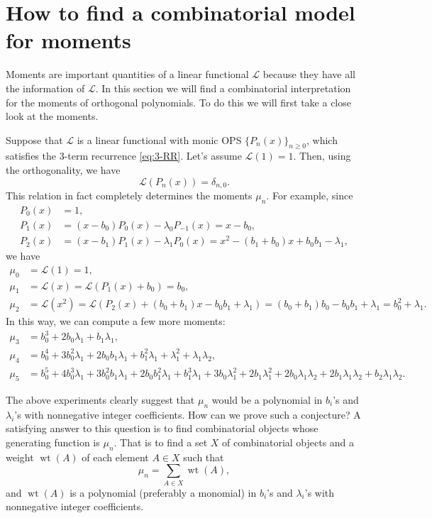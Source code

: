 \documentclass[oneside]{book}
\numberwithin{equation}{section}
\theoremstyle{definition}
\newcommand\LL{\mathcal{L}}
\newcommand\wt{\operatorname{wt}}
\begin{document}
\section{How to find a combinatorial model for moments}

Moments are important quantities of a linear functional \( \LL \)
because they have all the information of \( \LL \). In this section
we will find a combinatorial interpretation for the moments of
orthogonal polynomials. To do this we will first take a close look at
the moments.

Suppose that \( \LL \) is a linear functional with monic OPS
\( \{ P_n(x) \}_{n\ge 0} \), which satisfies the 3-term recurrence
\eqref{eq:3-RR}. Let's assume \( \LL(1)=1 \). Then, using the
orthogonality, we have
\begin{equation}\label{eq:13}
  \LL(P_n(x)) = \delta_{n,0}.
\end{equation}
This relation in fact completely determines the moments \( \mu_n \).
For example, since
\begin{align*}
  P_0(x) &= 1,\\
  P_1(x) &= (x-b_0)P_0(x) - \lambda_0P_{-1}(x) = x-b_0,\\
  P_2(x) &= (x-b_1)P_1(x) - \lambda_1P_0(x) =  x^2 - (b_1+b_0)x +b_0b_1 - \lambda_1,
\end{align*}
we have
\begin{align*}
 \mu_0 &= \LL(1) = 1, \\
 \mu_1 &= \LL(x) = \LL(P_1(x)+b_0) = b_0, \\
  \mu_2 &= \LL(x^2) = \LL(P_2(x)+(b_0+b_1)x-b_0b_1+\lambda_1)
          = (b_0+b_1)b_0 - b_0b_1 +\lambda_1 = b_0^2+\lambda_1.
\end{align*}
In this way, we can compute a few more moments:
\begin{align*}
  \mu_3 &= b_0^3 + 2b_0\lambda_1 + b_1\lambda_1,\\
  \mu_4 &= b_0^4 + 3b_0^2\lambda_1 + 2b_0b_1\lambda_1 + b_1^2\lambda_1 + \lambda_1^2 + \lambda_1\lambda_2,\\
  \mu_5 &= b_0^5 + 4b_0^3\lambda_1 + 3b_0^2b_1\lambda_1 + 2b_0b_1^2\lambda_1 + b_1^3\lambda_1 + 3b_0\lambda_1^2 + 2b_1\lambda_1^2 + 2b_0\lambda_1\lambda_2 + 2b_1\lambda_1\lambda_2 + b_2\lambda_1\lambda_2.
\end{align*}

The above experiments clearly suggest that \( \mu_n \) would be a
polynomial in \( b_i \)'s and \( \lambda_i \)'s with nonnegative
integer coefficients. How can we prove such a conjecture? A satisfying
answer to this question is to find combinatorial objects whose
generating function is \( \mu_n \). That is to find a set \( X \) of
combinatorial objects and a weight \( \wt(A) \) of each element
\( A\in X \) such that
\[
  \mu_n = \sum_{A \in X} \wt(A),
\]
and \( \wt(A) \) is a polynomial (preferably a monomial) in
\( b_i \)'s and \( \lambda_i \)'s with nonnegative integer
coefficients.
\end{document}
